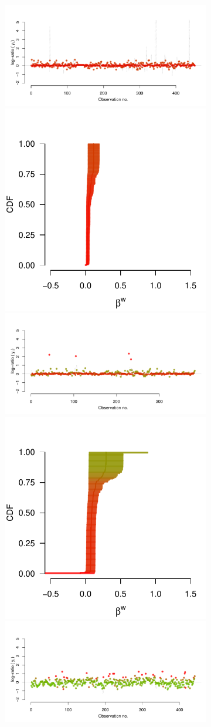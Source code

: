 \documentclass[9pt,a4paper,twocolumn,lineno]{article}
\begin{document}
\begin{figure}
	\centering
	\begin{subfigure}{.44\linewidth}
		\includegraphics[width=.7\linewidth]{thread_history_55_1}	
		\includegraphics[width=.28\linewidth]{beta_history_55_1}	
		\includegraphics[width=.7\linewidth]{thread_history_55_3}	
		\includegraphics[width=.28\linewidth]{beta_history_55_3}
		\includegraphics[width=.7\linewidth]{thread_history_148_3}	

\end{subfigure}
\end{figure}
\end{document}
